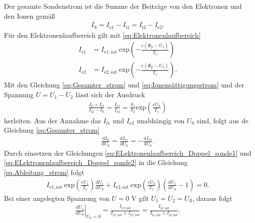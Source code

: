 Der gesamte Sondenstrom ist die Summe der Beiträge von den Elektronen und den Ionen gemäß
\begin{align}
I_{\mathrm{S}}=I_{\mathrm{e}1} -I_{\mathrm{i}1} = I_{\mathrm{i}2} -I_{\mathrm{e}2}.
\label{eq:Gesamter_strom}
\end{align} 
Für den Elektronenlaufbereich gilt mit \eqref{eq:Elektronenlaufbereich}
\begin{align}
I_{\mathrm{e}1} &=I_{\mathrm{e}1,\mathrm{sat}}\ \mathrm{exp} \left( -\frac{e(\Phi_{\mathrm{p}}-U_1)}{T_{\mathrm{e}}} \right) \label{eq:ELektronenlaufbereich_Doppel_sonde1} \\
I_{\mathrm{e}2} &=I_{\mathrm{e}2,\mathrm{sat}}\ \mathrm{exp} \left( -\frac{e(\Phi_{\mathrm{p}}-U_2)}{T_{\mathrm{e}}} \right). 
\label{eq:ELektronenlaufbereich_Doppel_sonde2}
\end{align}
Mit den Gleichung \eqref{eq:Gesamter_strom} und  \eqref{eq:Ionensättigungsstrom} und der Spannung $U=U_1-U_2$ lässt sich der Ausdruck
\begin{align}
\frac{I_{\mathrm{S}} + I_{\mathrm{i}1}}{ I_{\mathrm{i}2} - I_{\mathrm{S}}}= \frac{I_{\mathrm{e}1}}{I_{\mathrm{e}2}}= \frac{S_1}{S_2} \mathrm{exp} \left( \frac{e U_{\mathrm{S}}}{T_{\mathrm{e}}} \right)
\end{align}
herleiten. Aus der Annahme das $I_{\mathrm{i}1}$ und $I_{\mathrm{e}2}$ unabhängig von $U_{\mathrm{S}}$ sind, folgt aus de Gleichung \eqref{eq:Gesamter_strom}
\begin{align}
\frac{\mathrm{d} I_{\mathrm{S}}}{\mathrm{d} U_{\mathrm{S}}}= \frac{\mathrm{d} I_{\mathrm{e}1}}{\mathrm{d} U_{\mathrm{S}}}= -\frac{\mathrm{d} I_{\mathrm{e}2}}{\mathrm{d} U_{\mathrm{S}}}.
\label{eq.Ableitung_strom}
\end{align}
Durch einsetzen der Gleichungen \eqref{eq:ELektronenlaufbereich_Doppel_sonde1} und \eqref{eq:ELektronenlaufbereich_Doppel_sonde2} in die Gleichung \eqref{eq.Ableitung_strom} folgt
\begin{align}
I_{\mathrm{e}1,\mathrm{sat}}\ \mathrm{exp} \left( \frac{e U_1}{T_{\mathrm{e}}} \right) \frac{\mathrm{d} U_1}{\mathrm{d} U_{\mathrm{S}}} + I_{\mathrm{e}2,\mathrm{sat}}\ \mathrm{exp} \left( \frac{e U_2}{T_{\mathrm{e}}} \right)  \left( \frac{\mathrm{d} U_1}{\mathrm{d} U_{\mathrm{S}}} -1 \right) =0.
\end{align}
Bei einer angelegten Spannung von $U=0$ V gilt $U_1=U_2=U_{\mathrm{fl}}$, daraus folgt
\begin{align}
\left. \frac{\mathrm{d} U_1}{\mathrm{d} U_{\mathrm{S}}}\right\vert_{U_{\mathrm{S}}=0}= \frac{I_{\mathrm{e}2,\mathrm{sat}}}{I_{\mathrm{e}1,\mathrm{sat}}+I_{\mathrm{e}2,\mathrm{sat}}}=\frac{I_{\mathrm{i}2,\mathrm{sat}}}{I_{\mathrm{i}1,\mathrm{sat}}+I_{\mathrm{i}2,\mathrm{sat}}}.
\label{eq:Ableitung_2}
\end{align}  
